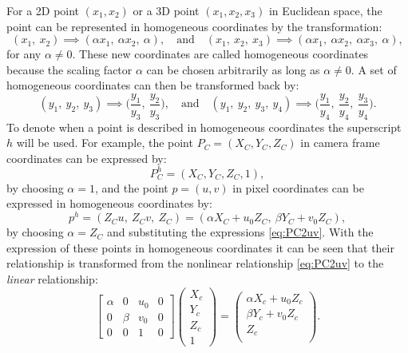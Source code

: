 For a 2D point $(x_1,x_2)$ or a 3D point $(x_1,x_2,x_3)$ in Euclidean space, the point can be represented in homogeneous coordinates by the transformation:
\begin{equation}
(x_1,\:x_2) \implies (\alpha x_1, \:\alpha x_2, \:\alpha), \quad \text{and} \quad (x_1,\:x_2,\:x_3) \implies (\alpha x_1,\:\alpha x_2, \:\alpha x_3, \: \alpha),
\end{equation}
for any $\alpha \neq 0$. These new coordinates are called homogeneous coordinates because the scaling factor $\alpha$ can be chosen arbitrarily as long as $\alpha \neq 0$. A set of homogeneous coordinates can then be transformed back by: 
\begin{equation}
(y_1, \: y_2, \:y_3) \implies \Big(\frac{y_1}{y_3}, \: \frac{y_2}{y_3}\Big), \quad \text{and} \quad (y_1,\:y_2,\:y_3,\:y_4) \implies \Big(\frac{y_1}{y_4}, \: \frac{y_2}{y_4}, \: \frac{y_3}{y_4}\Big).
\end{equation}
To denote when a point is described in homogeneous coordinates the superscript $h$ will be used. For example, the point $P_C = (X_C, Y_C, Z_C)$ in camera frame coordinates can be expressed by:
\begin{equation*}
    P_C^h = (X_C, Y_C, Z_C, 1),
\end{equation*}
by choosing $\alpha = 1$, and the point $p = (u,v)$ in pixel coordinates can be expressed in homogeneous coordinates by:
\begin{equation*}
    p^h = (Z_C u, \: Z_C v, \:Z_C) = (\alpha X_C + u_0 Z_C, \: \beta Y_C + v_0 Z_C),
\end{equation*}
by choosing $\alpha = Z_C$ and substituting the expressions \eqref{eq:PC2uv}. With the expression of these points in homogeneous coordinates it can be seen that their relationship is transformed from the nonlinear relationship \eqref{eq:PC2uv} to the \textit{linear} relationship:
\begin{equation}
\begin{bmatrix}
\alpha & 0 & u_{0} & 0 \\
0 & \beta & v_{0} & 0  \\
0 & 0 & 1 & 0
\end{bmatrix}
\begin{pmatrix}
X_{c} \\
Y_{c} \\
Z_{c} \\
1
\end{pmatrix}
=
\begin{pmatrix}
\alpha X_{c} + u_{0}Z_{c} \\
\beta Y_{c} + v_{0}Z_{c} \\
Z_{c} \\
\end{pmatrix}.
\end{equation}

